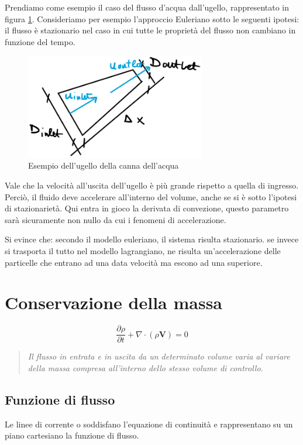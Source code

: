 Prendiamo come esempio il caso del flusso d'acqua dall'ugello, rappresentato in figura \ref{fig:EsempioAcqua}. 
Consideriamo per esempio l'approccio Euleriano sotto le seguenti ipotesi:
il flusso è stazionario nel caso in cui tutte le proprietà del flusso non cambiano in funzione del tempo.

\begin{figure}
\centering
\includegraphics[width = 0.7\textwidth]{gfx/EsempioAcqua}
\caption{Esempio dell'ugello della canna dell'acqua}
\label{fig:EsempioAcqua}	
\end{figure}

Vale che la velocità all'uscita dell'ugello è più grande rispetto a quella di ingresso.
Perciò, il fluido deve accelerare all'interno del volume, anche se si è sotto l'ipotesi di stazionarietà.
Qui entra in gioco la derivata di convezione, questo parametro sarà sicuramente non nullo da cui i fenomeni di accelerazione.

Si evince che: secondo il modello euleriano, il sistema risulta stazionario. se invece si trasporta il tutto nel modello lagrangiano, ne risulta un'accelerazione delle particelle che entrano ad una data velocità ma escono ad una superiore.

\section{Conservazione della massa}
\begin{equation}
\frac{\partial \rho}{\partial t} + \nabla \cdot (\rho\mathbf{V}) = 0
\label{eqn:EquazioneConservazione}
\end{equation}

\begin{quote}
\emph{Il flusso in entrata e in uscita da un determinato volume varia al variare della massa compresa all'interno dello stesso volume di controllo.}
\end{quote}

\subsection{Funzione di flusso}
Le linee di corrente o \textbf{} soddisfano l'equazione di continuità e rappresentano su un piano cartesiano la funzione di flusso.

